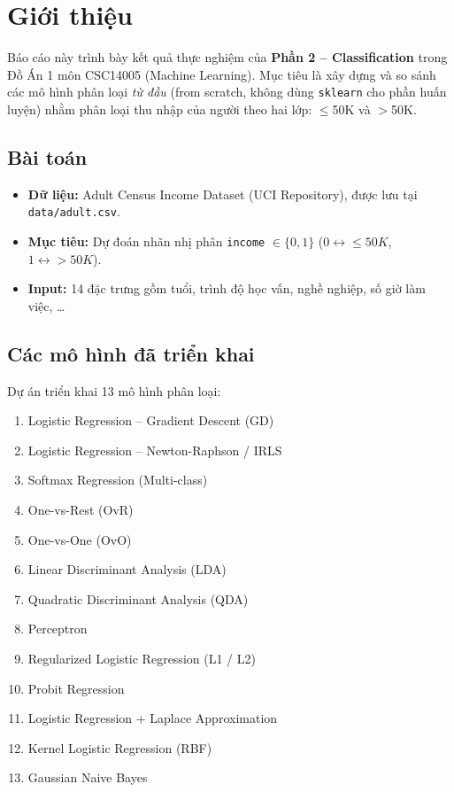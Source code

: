 \documentclass[12pt, a4paper]{article}
\begin{document}
\section{Giới thiệu}
\label{sec:intro}

Báo cáo này trình bày kết quả thực nghiệm của \textbf{Phần 2 -- Classification} trong Đồ Án 1 môn CSC14005 (Machine Learning).
Mục tiêu là xây dựng và so sánh các mô hình phân loại \emph{từ đầu} (from scratch, không dùng \texttt{sklearn} cho phần huấn luyện) nhằm phân loại thu nhập của người theo hai lớp: $\leq$50K và $>$50K.

\subsection{Bài toán}
\begin{itemize}
  \item \textbf{Dữ liệu:} Adult Census Income Dataset (UCI Repository), được lưu tại \texttt{data/adult.csv}.
  \item \textbf{Mục tiêu:} Dự đoán nhãn nhị phân \texttt{income} $\in \{0, 1\}$ ($0 \leftrightarrow {\leq}50K$, $1 \leftrightarrow {>}50K$).
  \item \textbf{Input:} 14 đặc trưng gồm tuổi, trình độ học vấn, nghề nghiệp, số giờ làm việc, \ldots
\end{itemize}

\subsection{Các mô hình đã triển khai}
Dự án triển khai 13 mô hình phân loại:
\begin{enumerate}
  \item Logistic Regression -- Gradient Descent (GD)
  \item Logistic Regression -- Newton-Raphson / IRLS
  \item Softmax Regression (Multi-class)
  \item One-vs-Rest (OvR)
  \item One-vs-One (OvO)
  \item Linear Discriminant Analysis (LDA)
  \item Quadratic Discriminant Analysis (QDA)
  \item Perceptron
  \item Regularized Logistic Regression (L1 / L2)
  \item Probit Regression
  \item Logistic Regression + Laplace Approximation
  \item Kernel Logistic Regression (RBF)
  \item Gaussian Naive Bayes
\end{enumerate}
\end{document}
